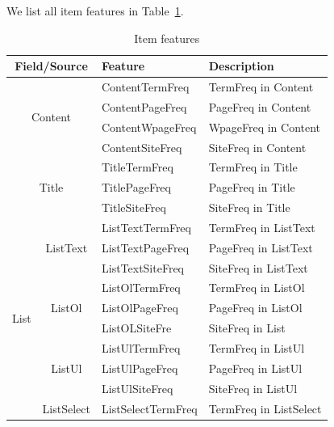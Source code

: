 We list all item features in Table~\ref{tab:facet-tfeature}. 
\begin{table}[!ht]
\centering
\caption{Item features}
\label{tab:facet-tfeature}
\begin{tabular}{|c|c|l|l|}
\hline
\multicolumn{2}{|c|}{\textbf{Field/Source}}                &  \textbf{Feature} & \textbf{Description}\\ \hline
\multicolumn{2}{|c|}{\multirow{4}{*}{Content}}   & ContentTermFreq & TermFreq in Content\\ 
\multicolumn{2}{|l|}{}                    &  ContentPageFreq & PageFreq in Content \\  
\multicolumn{2}{|l|}{}                    &  ContentWpageFreq & WpageFreq in Content \\  
\multicolumn{2}{|l|}{}                    &  ContentSiteFreq & SiteFreq in Content \\ \hline  
\multicolumn{2}{|c|}{\multirow{3}{*}{Title}}   & TitleTermFreq & TermFreq in Title  \\ 
\multicolumn{2}{|l|}{}                    &  TitlePageFreq & PageFreq in Title \\  
\multicolumn{2}{|l|}{}                    &  TitleSiteFreq & SiteFreq in Title \\  \hline
		   \multirow{18}{*}{List} & \multirow{3}{*}{ListText} & ListTextTermFreq & TermFreq in ListText \\ 
						 &                   &  ListTextPageFreq & PageFreq in ListText \\ 
					         &                   &  ListTextSiteFreq & SiteFreq in ListText \\ \cline{2-4} 
                  & \multirow{3}{*}{ListOl} & ListOlTermFreq & TermFreq in ListOl \\ 
                  &                   &  ListOlPageFreq      & PageFreq in ListOl\\ 
                  &                   &  ListOLSiteFre       & SiteFreq in List\\ \cline{2-4} 
                  & \multirow{3}{*}{ListUl} & ListUlTermFreq  & TermFreq in ListUl \\ 
                  &                   &  ListUlPageFreq       & PageFreq in ListUl \\ 
                  &                   &  ListUlSiteFreq       & SiteFreq in ListUl \\ \cline{2-4} 
                  & \multirow{3}{*}{ListSelect} & ListSelectTermFreq  & TermFreq in ListSelect \\ 

\end{tabular}
\end{table}
